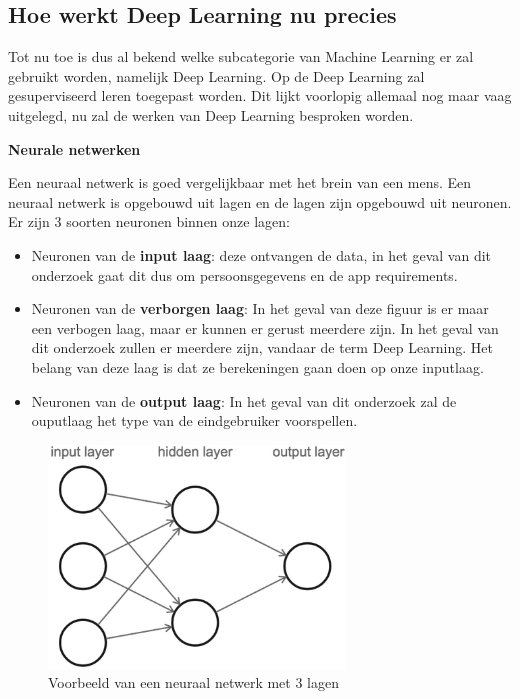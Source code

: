 \subsection{Hoe werkt Deep Learning nu precies}

Tot nu toe is dus al bekend welke subcategorie van Machine Learning er zal gebruikt worden, namelijk Deep Learning. Op de Deep Learning zal gesuperviseerd leren toegepast worden. Dit lijkt voorlopig allemaal nog maar vaag uitgelegd, nu zal de werken van Deep Learning besproken worden.

\textbf{Neurale netwerken}

Een neuraal netwerk is goed vergelijkbaar met het brein van een mens. Een neuraal netwerk is opgebouwd uit lagen en de lagen zijn opgebouwd uit neuronen. Er zijn 3 soorten neuronen binnen onze lagen:

\begin{itemize}
\setlength\itemsep{1.5em}
    \item  Neuronen van de \textbf{input laag}: deze ontvangen de data, in het geval van dit onderzoek gaat dit dus om persoonsgegevens en de app requirements.
    \item Neuronen van de \textbf{verborgen laag}: In het geval van deze figuur is er maar een verbogen laag, maar er kunnen er gerust meerdere zijn. In het geval van dit onderzoek zullen er meerdere zijn, vandaar de term Deep Learning. Het belang van deze laag is dat ze berekeningen gaan doen op onze inputlaag. 
    \item Neuronen van de \textbf{output laag}: In het geval van dit onderzoek zal de ouputlaag het type van de eindgebruiker voorspellen. 
\end{itemize}

\newpage
\begin{figure}[h!]
\centering
\includegraphics[width=0.7\textwidth]{bachproef/img/neuraalnetwerk.png}
\caption{Voorbeeld van een neuraal netwerk met 3 lagen \autocite{stackexchange.com}}
\end{figure}


